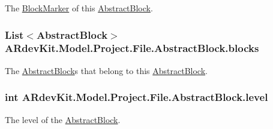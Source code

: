 The \hyperlink{class_a_rdev_kit_1_1_model_1_1_project_1_1_file_1_1_block_marker}{Block\-Marker} of this \hyperlink{class_a_rdev_kit_1_1_model_1_1_project_1_1_file_1_1_abstract_block}{Abstract\-Block}. 

\hypertarget{class_a_rdev_kit_1_1_model_1_1_project_1_1_file_1_1_abstract_block_ae48e43536b76e45e5c84b837cc9bc093}{
\subsubsection[{blocks}]{\setlength{\rightskip}{0pt plus 5cm}List$<${\bf Abstract\-Block}$>$ A\-Rdev\-Kit.\-Model.\-Project.\-File.\-Abstract\-Block.\-blocks\hspace{0.3cm}{\ttfamily [protected]}}}\label{class_a_rdev_kit_1_1_model_1_1_project_1_1_file_1_1_abstract_block_ae48e43536b76e45e5c84b837cc9bc093}


The \hyperlink{class_a_rdev_kit_1_1_model_1_1_project_1_1_file_1_1_abstract_block}{Abstract\-Block}s that belong to this \hyperlink{class_a_rdev_kit_1_1_model_1_1_project_1_1_file_1_1_abstract_block}{Abstract\-Block}. 

\hypertarget{class_a_rdev_kit_1_1_model_1_1_project_1_1_file_1_1_abstract_block_a7c07abfe27f2f9104fe7c3d23c7333a5}{
\subsubsection[{level}]{\setlength{\rightskip}{0pt plus 5cm}int A\-Rdev\-Kit.\-Model.\-Project.\-File.\-Abstract\-Block.\-level\hspace{0.3cm}{\ttfamily [protected]}}}\label{class_a_rdev_kit_1_1_model_1_1_project_1_1_file_1_1_abstract_block_a7c07abfe27f2f9104fe7c3d23c7333a5}


The level of the \hyperlink{class_a_rdev_kit_1_1_model_1_1_project_1_1_file_1_1_abstract_block}{Abstract\-Block}. 

